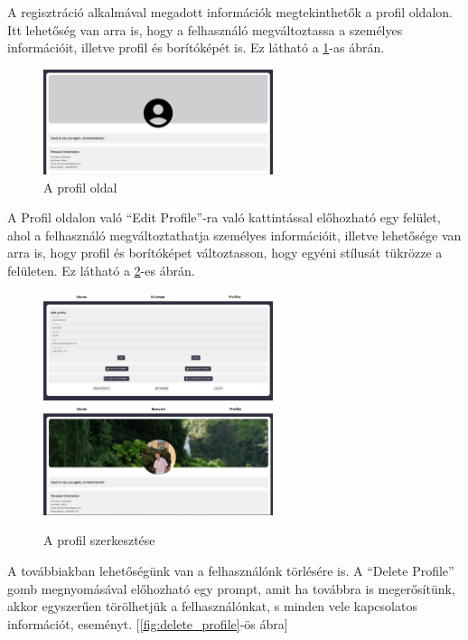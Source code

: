 A regisztráció alkalmával megadott információk megtekinthetők a profil oldalon. Itt lehetőség van arra is, hogy a felhasználó megváltoztassa a személyes
információit, illetve profil és borítóképét is. Ez látható a \ref{fig:profile_page}-as ábrán.

\begin{figure}[ht]
	\centering
	\includegraphics[width=0.6\textwidth]{images/profile_1.png}
	\caption{A profil oldal}
	\label{fig:profile_page}
\end{figure}

A Profil oldalon való ``Edit Profile''-ra való kattintással előhozható egy felület, ahol a felhasználó megváltoztathatja személyes információit,
illetve lehetősége van arra is, hogy profil és borítóképet változtasson, hogy egyéni stílusát tükrözze a felületen. Ez látható a 
\ref{fig:profile_edit_page}-es ábrán.

\begin{figure}[h]
		\centering
		\includegraphics[width=0.6\textwidth]{images/profile_edit.png}
		\includegraphics[width=0.6\textwidth]{images/profile_2.png}
	\caption{A profil szerkesztése}
	\label{fig:profile_edit_page}
\end{figure}

A továbbiakban lehetőségünk van a felhasználónk törlésére is. A ``Delete Profile'' gomb megnyomásával előhozható egy prompt, 
amit ha továbbra is megerősítünk, akkor egyszerűen törölhetjük a felhasználónkat, s minden vele kapcsolatos információt, eseményt. [\ref{fig:delete_profile}-ös ábra]

